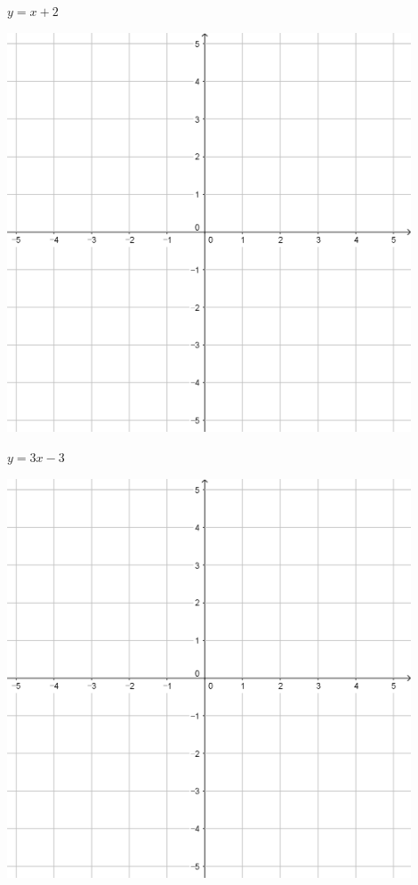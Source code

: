 \documentclass{oblivoir}
\begin{document}
\clearpage
\label{lline3}
\par\medskip
\begin{minipage}{0.45\textwidth}\centering
\(y=x+2\)
\par\bigskip\includegraphics[width=0.9\textwidth]{55}
\end{minipage}
\begin{minipage}{0.45\textwidth}\centering
\(y=3x-3\)
\par\bigskip\includegraphics[width=0.9\textwidth]{55}
\end{minipage}\bigskip\bigskip\par
\end{document}
